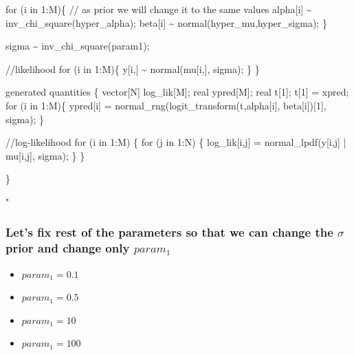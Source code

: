 \documentclass[
]{article}
\newenvironment{Shaded}{\begin{snugshade}}{\end{snugshade}}
\newcommand{\StringTok}[1]{\textcolor[rgb]{0.31,0.60,0.02}{#1}}
\providecommand{\tightlist}{%
  \setlength{\itemsep}{0pt}\setlength{\parskip}{0pt}}
\begin{document}
\begin{Shaded}
\begin{Highlighting}[]
\StringTok{  for (i in 1:M)\{}
\StringTok{    // as prior we will change it to the same values}
\StringTok{    alpha[i] \textasciitilde{} inv\_chi\_square(hyper\_alpha);}
\StringTok{    beta[i] \textasciitilde{} normal(hyper\_mu,hyper\_sigma);}
\StringTok{  \}}

\StringTok{  sigma \textasciitilde{} inv\_chi\_square(param1);}

\StringTok{  //likelihood}
\StringTok{  for (i in 1:M)\{}
\StringTok{    y[i,] \textasciitilde{} normal(mu[i,], sigma);}
\StringTok{  \}}
\StringTok{\}}

\StringTok{generated quantities \{}
\StringTok{  vector[N] log\_lik[M];}
\StringTok{  real ypred[M];}
\StringTok{  real t[1];}
\StringTok{  t[1] = xpred;}
\StringTok{  for (i in 1:M)\{}
\StringTok{    ypred[i] = normal\_rng(logit\_transform(t,alpha[i], beta[i])[1], sigma);}
\StringTok{  \}}

\StringTok{  //log{-}likelihood}
\StringTok{  for (i in 1:M) \{}
\StringTok{    for (j in 1:N) \{}
\StringTok{    log\_lik[i,j] = normal\_lpdf(y[i,j] | mu[i,j], sigma);}
\StringTok{    \}}
\StringTok{  \}}

\StringTok{\}}

\StringTok{"}
\end{Highlighting}
\end{Shaded}

\hypertarget{lets-fix-rest-of-the-parameters-so-that-we-can-change-the-sigma-prior-and-change-only-param_1-1}{%
\subsubsection{\texorpdfstring{Let's fix rest of the parameters so that
we can change the \(\sigma\) prior and change only
\(param_1\)}{Let's fix rest of the parameters so that we can change the \textbackslash sigma prior and change only param\_1}}\label{lets-fix-rest-of-the-parameters-so-that-we-can-change-the-sigma-prior-and-change-only-param_1-1}}

\begin{itemize}
\tightlist
\item
  \(param_1 = 0.1\)
\item
  \(param_1 = 0.5\)
\item
  \(param_1 = 10\)
\item
  \(param_1 = 100\)
\end{itemize}
\end{document}
